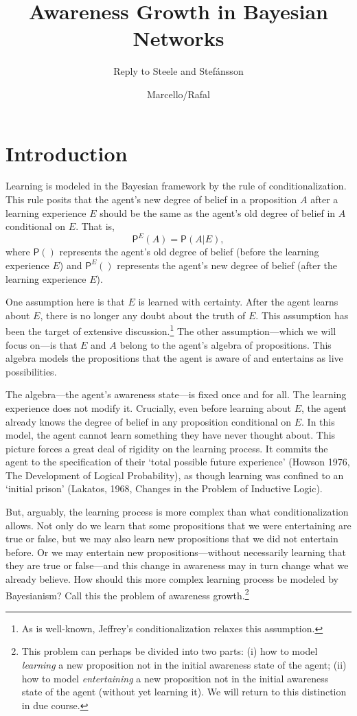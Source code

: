 \documentclass[
  11pt,
  dvipsnames,enabledeprecatedfontcommands]{scrartcl}
\title{Awareness Growth in Bayesian Networks}
\subtitle{Reply to Steele and Stefánsson}
\author{Marcello/Rafal}
\date{}
\newcommand{\pr}[1]{\ensuremath{\mathsf{P}(#1)}}
\newcommand{\ppr}[2]{\ensuremath{\mathsf{P}^{#1}(#2)}}
\begin{document}
\maketitle

\hypertarget{introduction}{%
\section{Introduction}\label{introduction}}

Learning is modeled in the Bayesian framework by the rule of
conditionalization. This rule posits that the agent's new degree of
belief in a proposition \(A\) after a learning experience \(E\) should
be the same as the agent's old degree of belief in \(A\) conditional on
\(E\). That is, \[\ppr{E}{A}=\pr{A \vert E},\] where \(\pr{}\)
represents the agent's old degree of belief (before the learning
experience \(E\)) and \(\ppr{E}{}\) represents the agent's new degree of
belief (after the learning experience \(E\)).

One assumption here is that \(E\) is learned with certainty. After the
agent learns about \(E\), there is no longer any doubt about the truth
of \(E\). This assumption has been the target of extensive
discussion.\footnote{As is well-known, Jeffrey's conditionalization
  relaxes this assumption.} The other assumption---which we will focus
on---is that \(E\) and \(A\) belong to the agent's algebra of
propositions. This algebra models the propositions that the agent is
aware of and entertains as live possibilities.

The algebra---the agent's awareness state---is fixed once and for all.
The learning experience does not modify it. Crucially, even before
learning about \(E\), the agent already knows the degree of belief in
any proposition conditional on \(E\). In this model, the agent cannot
learn something they have never thought about. This picture forces a
great deal of rigidity on the learning process. It commits the agent to
the specification of their `total possible future experience' (Howson
1976, The Development of Logical Probability), as though learning was
confined to an `initial prison' (Lakatos, 1968, Changes in the Problem
of Inductive Logic).

But, arguably, the learning process is more complex than what
conditionalization allows. Not only do we learn that some propositions
that we were entertaining are true or false, but we may also learn new
propositions that we did not entertain before. Or we may entertain new
propositions---without necessarily learning that they are true or
false---and this change in awareness may in turn change what we already
believe. How should this more complex learning process be modeled by
Bayesianism? Call this the problem of awareness growth.\footnote{This
  problem can perhaps be divided into two parts: (i) how to model
  \textit{learning} a new proposition not in the initial awareness state
  of the agent; (ii) how to model \textit{entertaining} a new
  proposition not in the initial awareness state of the agent (without
  yet learning it). We will return to this distinction in due course.}
\end{document}
